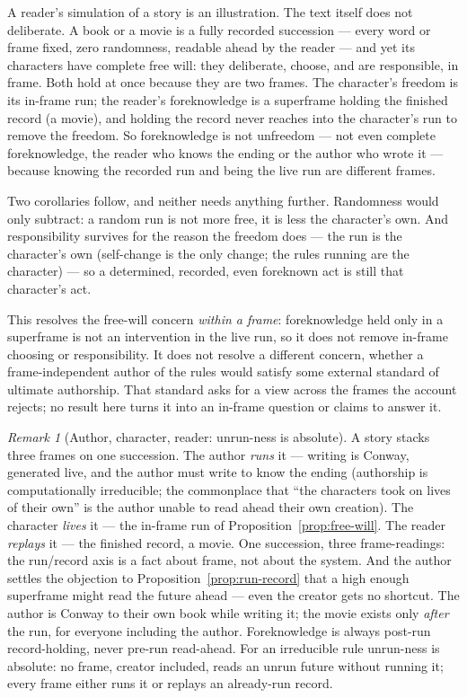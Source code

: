 \documentclass[11pt,a4paper]{article}
\theoremstyle{remark}\newtheorem{remark}[definition]{Remark}
\begin{document}
A reader's simulation of a story is an illustration. The text itself does not deliberate. A book or a movie is a fully recorded succession --- every
word or frame fixed, zero randomness, readable ahead by the reader --- and yet its
characters have complete free will: they deliberate, choose, and are responsible, in
frame. Both hold at once because they are two frames. The character's freedom is its
in-frame run; the reader's foreknowledge is a superframe holding the finished record (a
movie), and holding the record never reaches into the character's run to remove the
freedom. So foreknowledge is not unfreedom --- not even complete foreknowledge, the
reader who knows the ending or the author who wrote it --- because knowing the recorded
run and being the live run are different frames.

Two corollaries follow, and neither needs anything further. Randomness would only
subtract: a random run is not more free, it is less the character's own. And
responsibility survives for the reason the freedom does --- the run is the character's
own (self-change is the only change; the rules running are the character) --- so a
determined, recorded, even foreknown act is still that character's act.

This resolves the free-will concern \emph{within a frame}: foreknowledge held only in a superframe
is not an intervention in the live run, so it does not remove in-frame choosing or responsibility.
It does not resolve a different concern, whether a frame-independent author of the rules would satisfy
some external standard of ultimate authorship. That standard asks for a view across the frames the
account rejects; no result here turns it into an in-frame question or claims to answer it.

\begin{remark}[Author, character, reader: unrun-ness is absolute]\label{rem:three-frames}
A story stacks three frames on one succession. The author \emph{runs} it --- writing is
Conway, generated live, and the author must write to know the ending (authorship is
computationally irreducible; the commonplace that ``the characters took on lives of
their own'' is the author unable to read ahead their own creation). The character
\emph{lives} it --- the in-frame run of Proposition~\ref{prop:free-will}. The reader
\emph{replays} it --- the finished record, a movie. One succession, three
frame-readings: the run/record axis is a fact about frame, not about the system. And
the author settles the objection to Proposition~\ref{prop:run-record} that a high
enough superframe might read the future ahead --- even the creator gets no shortcut.
The author is Conway to their own book while writing it; the movie exists only
\emph{after} the run, for everyone including the author. Foreknowledge is always
post-run record-holding, never pre-run read-ahead. For an irreducible rule unrun-ness is
absolute: no frame, creator included, reads an unrun future without running it; every frame
either runs it or replays an already-run record.
\end{remark}
\end{document}
